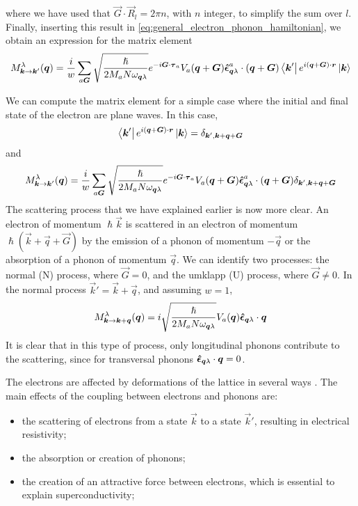 where we have used that $\vec{G} \cdot \vec{R}_l = 2\pi n$, with $n$ integer, to simplify the sum over $l$. Finally, inserting this result in \cref{eq:general_electron_phonon_hamiltonian}, we obtain an expression for the matrix element
\begin{equation}
    M_{\mathbf{\boldsymbol{k}} \rightarrow \mathbf{\boldsymbol{k}}'}^\lambda(\mathbf{\boldsymbol{q}}) =  \frac{i}{w} \sum_{a\mathbf{\boldsymbol{G}}} \sqrt{\frac{\hslash}{2M_aN\omega_{\mathbf{\boldsymbol{q}}\lambda}}}  e^{-i \mathbf{\boldsymbol{G}} \cdot \mathbf{\boldsymbol{\tau}}_a} V_a(\mathbf{\boldsymbol{q}} + \mathbf{\boldsymbol{G}}) \mathbf{\boldsymbol{\hat{\epsilon}}}_{\mathbf{\boldsymbol{q}}\lambda}^a \cdot (\mathbf{\boldsymbol{q}}+\mathbf{\boldsymbol{G}}) \bra{\mathbf{\boldsymbol{k}}'} e^{i(\mathbf{\boldsymbol{q}} + \mathbf{\boldsymbol{G}})\cdot \mathbf{\boldsymbol{r}}} \ket{\mathbf{\boldsymbol{k}}}
\end{equation}

We can compute the matrix element for a simple case where the initial and final state of the electron are plane waves. In this case,
\begin{equation} \label{eq:plane_waves}
    \bra{\mathbf{\boldsymbol{k}}'} e^{i(\mathbf{\boldsymbol{q}} + \mathbf{\boldsymbol{G}})\cdot \mathbf{\boldsymbol{r}}} \ket{\mathbf{\boldsymbol{k}}} = \delta_{\mathbf{\boldsymbol{k}}', \mathbf{\boldsymbol{k}}+\mathbf{\boldsymbol{q}}+\mathbf{\boldsymbol{G}}}
\end{equation}
and
\begin{equation}
    M_{\mathbf{\boldsymbol{k}} \rightarrow \mathbf{\boldsymbol{k}}'}^\lambda(\mathbf{\boldsymbol{q}}) =  \frac{i}{w} \sum_{a\mathbf{\boldsymbol{G}}} \sqrt{\frac{\hslash}{2M_aN\omega_{\mathbf{\boldsymbol{q}}\lambda}}}  e^{-i \mathbf{\boldsymbol{G}} \cdot \mathbf{\boldsymbol{\tau}}_a} V_a(\mathbf{\boldsymbol{q}} + \mathbf{\boldsymbol{G}}) \mathbf{\boldsymbol{\hat{\epsilon}}}_{\mathbf{\boldsymbol{q}}\lambda}^a \cdot (\mathbf{\boldsymbol{q}}+\mathbf{\boldsymbol{G}}) \delta_{\mathbf{\boldsymbol{k}}', \mathbf{\boldsymbol{k}}+\mathbf{\boldsymbol{q}}+\mathbf{\boldsymbol{G}}}
\end{equation}
The scattering process that we have explained earlier is now more clear. An electron of momentum $\hslash\vec{k}$ is scattered in an electron of momentum $\hslash (\vec{k}+\vec{q}+\vec{G})$ by the emission of a phonon of momentum $-\vec{q}$ or the absorption of a phonon of momentum $\vec{q}$. We can identify two processes: the normal (N) process, where $\vec{G} = 0$, and the umklapp (U) process, where $\vec{G} \neq 0$. In the normal process $\vec{k}' = \vec{k} + \vec{q}$, and assuming $w=1$,
\begin{equation} \label{eq:phonon_matrix_normal}
    M_{\mathbf{\boldsymbol{k}} \rightarrow \mathbf{\boldsymbol{k}} + \mathbf{\boldsymbol{q}}}^\lambda(\mathbf{\boldsymbol{q}}) =  i \sqrt{\frac{\hslash}{2M_aN\omega_{\mathbf{\boldsymbol{q}}\lambda}}}   V_a(\mathbf{\boldsymbol{q}}) \mathbf{\boldsymbol{\hat{\epsilon}}}_{\mathbf{\boldsymbol{q}}\lambda} \cdot \mathbf{\boldsymbol{q}}
\end{equation}
It is clear that in this type of process, only longitudinal phonons contribute to the scattering, since for transversal phonons $\mathbf{\boldsymbol{\hat{\epsilon}}}_{\mathbf{\boldsymbol{q}}\lambda} \cdot \mathbf{\boldsymbol{q}} = 0$.

The electrons are affected by deformations of the lattice in several ways \cite{kittel1987}. The main effects of the coupling between  electrons and phonons are:
\begin{itemize}
    \item the scattering of electrons from a state $\vec{k}$ to a state $\vec{k}'$, resulting in electrical resistivity;
    \item the absorption or creation of phonons;
    \item the creation of an attractive force between electrons, which is essential to explain superconductivity;
\end{itemize}

